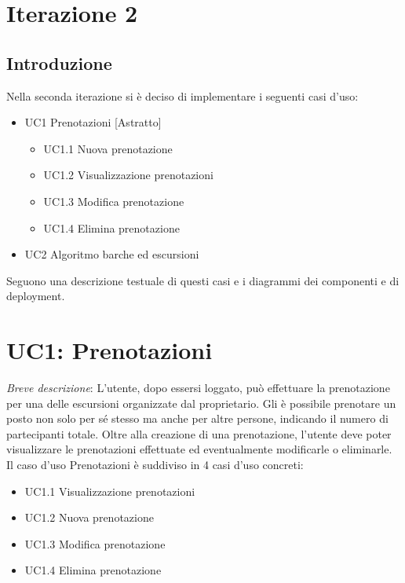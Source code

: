 \section{Iterazione 2}

\subsection{Introduzione}
Nella seconda iterazione si è deciso di implementare i seguenti casi d'uso:

\begin{itemize}
    \item UC1 Prenotazioni [Astratto]
    \begin{itemize}
        \item UC1.1 Nuova prenotazione
        \item UC1.2 Visualizzazione prenotazioni
        \item UC1.3 Modifica prenotazione
        \item UC1.4 Elimina prenotazione
    \end{itemize}
    \item UC2 Algoritmo barche ed escursioni
\end{itemize}

Seguono una descrizione testuale di questi casi e i diagrammi dei componenti e di deployment.

\section{UC1: Prenotazioni}
\emph{Breve descrizione}: L'utente, dopo essersi loggato, può effettuare la prenotazione per una delle escursioni organizzate dal proprietario. Gli è possibile prenotare un posto non solo per sé stesso ma anche per altre persone, indicando il numero di partecipanti totale. Oltre alla creazione di una prenotazione, l'utente deve poter visualizzare le prenotazioni effettuate ed eventualmente modificarle o eliminarle.
Il caso d'uso Prenotazioni è suddiviso in 4 casi d'uso concreti:

\begin{itemize}
    \item UC1.1 Visualizzazione prenotazioni 
    \item UC1.2 Nuova prenotazione
    \item UC1.3 Modifica prenotazione
    \item UC1.4 Elimina prenotazione
\end{itemize}


